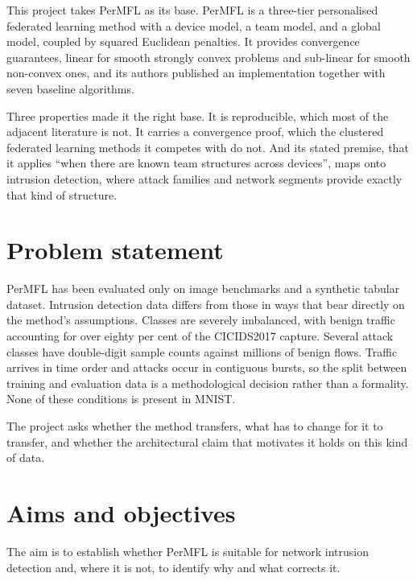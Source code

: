 This project takes PerMFL \parencite{permfl-2024} as its base. PerMFL is a
three-tier personalised federated learning method with a device model, a team
model, and a global model, coupled by squared Euclidean penalties. It provides
convergence guarantees, linear for smooth strongly convex problems and
sub-linear for smooth non-convex ones, and its authors published an
implementation together with seven baseline algorithms.

Three properties made it the right base. It is reproducible, which most of the
adjacent literature is not. It carries a convergence proof, which the clustered
federated learning methods it competes with do not. And its stated premise, that
it applies ``when there are known team structures across devices'', maps onto
intrusion detection, where attack families and network segments provide exactly
that kind of structure.

\section{Problem statement}
\label{sec:problem}

PerMFL has been evaluated only on image benchmarks and a synthetic tabular
dataset. Intrusion detection data differs from those in ways that bear directly
on the method's assumptions. Classes are severely imbalanced, with benign
traffic accounting for over eighty per cent of the CICIDS2017 capture. Several
attack classes have double-digit sample counts against millions of benign
flows. Traffic arrives in time order and attacks occur in contiguous bursts, so
the split between training and evaluation data is a methodological decision
rather than a formality. None of these conditions is present in MNIST.

The project asks whether the method transfers, what has to change for it to
transfer, and whether the architectural claim that motivates it holds on this
kind of data.

\section{Aims and objectives}
\label{sec:aims}

The aim is to establish whether PerMFL is suitable for network intrusion
detection and, where it is not, to identify why and what corrects it.

